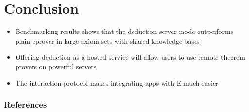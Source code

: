 \documentclass[10pt]{beamer}
\begin{document}
\section{Conclusion}
\begin{frame}[fragile]
  \begin{itemize}[<+- | alert@+>]
    \item Benchmarking results shows that the deduction server mode outperforms plain eprover in large axiom sets with shared knowledge bases
    \item Offering deduction as a hosted service will allow users to use remote theorem provers on powerful servers
    \item The interaction protocol makes integrating apps with E much easier
  \end{itemize}
\end{frame}


\begin{frame}[allowframebreaks]

  \frametitle{References}

  
  

\end{frame}
\end{document}
